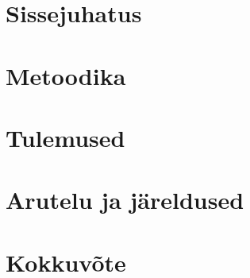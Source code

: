 

\chapter{Sissejuhatus}\label{chapter:introduction}


\chapter{Metoodika}\label{chapter:method}


\chapter{Tulemused}\label{chapter:results}


\chapter{Arutelu ja järeldused}\label{chapter:discussion}


\chapter{Kokkuvõte}\label{chapter:summary}


